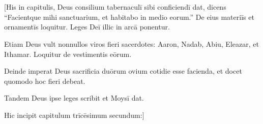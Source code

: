 \chapter{}


\vspace*{-1.4cm}
\thispagestyle{empty}

[His in capitulis, Deus consilium tabernaculī sibi conficiendī dat, dicens ``Facientque mihi sanctuarium, et habitabo in medio eorum.'' De eius materiīs et ornamentīs loquitur. Leges Deī illic in arcā ponentur.

Etiam Deus vult nonnullos viros fieri sacerdotes: Aaron, Nadab, Abiu, Eleazar, et Ithamar. Loquitur de vestimentis eōrum.

Deinde imperat Deus sacrificia duōrum ovium cotidie esse facienda, et docet quomodo hoc fieri debeat.

Tandem Deus ipse leges scribit et Moysī dat.

Hic incipit capitulum trīcēsimum secundum:]


